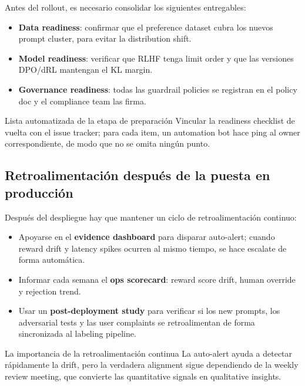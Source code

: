 \documentclass[a4paper]{article}
\begin{document}
Antes del rollout, es necesario consolidar los siguientes entregables:
\begin{itemize}
    \item \textbf{Data readiness}: confirmar que el preference dataset cubra los nuevos prompt cluster, para evitar la distribution shift.
    \item \textbf{Model readiness}: verificar que RLHF tenga limit order y que las versiones DPO/dRL mantengan el KL margin.
    \item \textbf{Governance readiness}: todas las guardrail policies se registran en el policy doc y el compliance team las firma.
\end{itemize}

\begin{knowledgebox}{Lista automatizada de la etapa de preparación}
Vincular la readiness checklist de vuelta con el issue tracker; para cada item, un automation bot hace ping al owner correspondiente, de modo que no se omita ningún punto.
\end{knowledgebox}

\subsection{Retroalimentación después de la puesta en producción}

Después del despliegue hay que mantener un ciclo de retroalimentación continuo:
\begin{itemize}
    \item Apoyarse en el \textbf{evidence dashboard} para disparar auto-alert; cuando reward drift y latency spikes ocurren al mismo tiempo, se hace escalate de forma automática.
    \item Informar cada semana el \textbf{ops scorecard}: reward score drift, human override y rejection trend.
    \item Usar un \textbf{post-deployment study} para verificar si los new prompts, los adversarial tests y las user complaints se retroalimentan de forma sincronizada al labeling pipeline.
\end{itemize}

\begin{importantbox}{La importancia de la retroalimentación continua}
La auto-alert ayuda a detectar rápidamente la drift, pero la verdadera alignment sigue dependiendo de la weekly review meeting, que convierte las quantitative signals en qualitative insights.
\end{importantbox}
\end{document}
